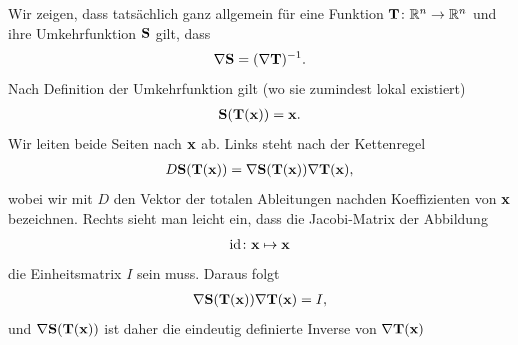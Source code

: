 \begin{Vertiefung}
  Wir zeigen, dass tatsächlich ganz allgemein für eine Funktion
  $\mathbf{T}\colon \mathbb R^n \to \mathbb R^n$ und ihre Umkehrfunktion $\mathbf{S}$ gilt, dass
  \begin{gather*}
    \nabla \mathbf{S} = (\nabla \mathbf{T})^{-1}.
  \end{gather*}
  Nach Definition der Umkehrfunktion gilt (wo sie zumindest lokal existiert)
  \begin{gather*}
    \mathbf{S}(\mathbf{T}(\mathbf{x})) = \mathbf{x}.
  \end{gather*}
  Wir leiten beide Seiten nach $\mathbf{x}$ ab. Links steht nach der Kettenregel
  \begin{gather*}
    D \mathbf{S}(\mathbf{T}(\mathbf{x})) = \nabla \mathbf{S}(\mathbf{T}(\mathbf{x})) \nabla \mathbf{T}(\mathbf{x}),
  \end{gather*}
  wobei wir mit $D$ den Vektor der totalen Ableitungen nachden
  Koeffizienten von $\mathbf{x}$ bezeichnen. Rechts sieht man leicht ein, dass die Jacobi-Matrix der Abbildung
  \begin{gather*}
    \operatorname{id}\colon \mathbf{x}\mapsto \mathbf{x}
  \end{gather*}
  die Einheitsmatrix $I$ sein muss. Daraus folgt
  \begin{gather*}
    \nabla \mathbf{S}(\mathbf{T}(\mathbf{x})) \nabla \mathbf{T}(\mathbf{x}) = I,
  \end{gather*}
  und \(\nabla \mathbf{S}(\mathbf{T}(\mathbf{x}))\) ist daher die eindeutig definierte Inverse von \( \nabla \mathbf{T}(\mathbf{x})\)
\end{Vertiefung}

